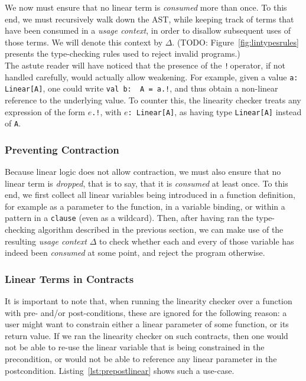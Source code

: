\documentclass[a4paper,twoside]{article}
\newcommand{\TODO}[1]{\textcolor{YellowOrange}{(TODO: #1)}} %
\newcommand{\RefFig}[1]{Figure~\ref{#1}}
\newcommand{\RefCode}[1]{Listing~\ref{#1}}
\newcommand{\stt}[1]{\texttt{\small{#1}}}
\begin{document}
\begin{enumerate}
We now must ensure that no linear term is \textit{consumed} more than once. To this end, we must recursively walk down the AST, while keeping track of terms that have been consumed in a \textit{usage context}, in order to disallow subsequent uses of those terms. We will denote this context by $\Delta$. \TODO{\RefFig{fig:lintypesrules} presents the type-checking rules used to reject invalid programs.}\\

The astute reader will have noticed that the presence of the \stt{!}\,operator, if not handled carefully, would actually allow weakening. For example, given a value \stt{a:\,Linear[A]}, one could write \stt{val b:\, A = a.!}, and thus obtain a non-linear reference to the underlying value. To counter this, the linearity checker treats any expression of the form \stt{$e$.!}, with \stt{$e$:\,Linear[A]}, as having type \stt{Linear[A]} instead of \stt{A}.

\subsubsection*{Preventing Contraction}

Because linear logic does not allow contraction, we must also ensure that no linear term is \textit{dropped}, that is to say, that it is \textit{consumed} at least once. To this end, we first collect all linear variables being introduced in a function definition, for example as a parameter to the function, in a variable binding, or within a pattern in a \texttt{clause} (even as a wildcard). Then, after having ran the type-checking algorithm described in the previous section, we can make use of the resulting \textit{usage context} $\Delta$ to check whether each and every of those variable has indeed been \textit{consumed} at some point, and reject the program otherwise.

\subsubsection*{Linear Terms in Contracts}

It is important to note that, when running the linearity checker over a function with pre- and/or post-conditions, these are ignored for the following reason: a user might want to constrain either a linear parameter of some function, or its return value. If we ran the linearity checker on such contracts, then one would not be able to re-use the linear variable that is being constrained in the precondition, or would not be able to reference any linear parameter in the postcondition. \RefCode{lst:prepostlinear} shows such a use-case.


\end{enumerate}
\end{document}
